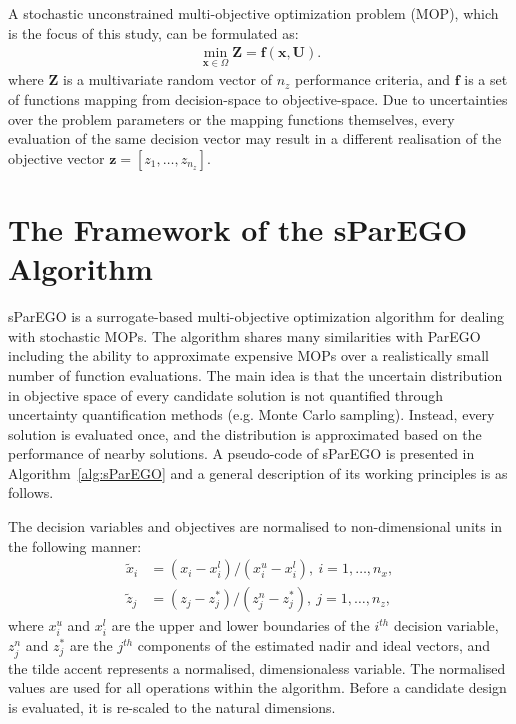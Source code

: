 \documentclass{llncs}
\newcommand{\brr}[1]{{\left({#1}\right)}} %
\newcommand{\vx}{\mathbf{x}} %
\newcommand{\vf}{\mathbf{f}} %
\newcommand{\vz}{\mathbf{z}} %
\newcommand{\vZ}{\mathbf{Z}} %
\newcommand{\vU}{\mathbf{U}} %
\begin{document}
A stochastic unconstrained multi-objective optimization problem (MOP), which is the focus of this study, can be formulated as:
\begin{align}
\label{eq:mop}
        \min_{\vx\in\Omega} \vZ=\vf\brr{\vx, \vU}.
\end{align}
where $\vZ$ is a multivariate random vector of $n_z$ performance criteria, and $\vf$ is a set of functions mapping from decision-space to objective-space. Due to uncertainties over the problem parameters or the mapping functions themselves, every evaluation of the same decision vector may result in a different realisation of the objective vector $\vz=[z_1,\ldots,z_{n_z}]$.

\section{The Framework of the sParEGO Algorithm}\label{sec:framework}


sParEGO is a surrogate-based multi-objective optimization algorithm for dealing with stochastic MOPs. The algorithm shares many similarities with ParEGO including the ability to approximate expensive MOPs over a realistically small number of function evaluations. The main idea is that the uncertain distribution in objective space of every candidate solution is not quantified through uncertainty quantification methods (e.g. Monte Carlo sampling). Instead, every solution is evaluated once, and the distribution is approximated based on the performance of nearby solutions. A pseudo-code of sParEGO is presented in Algorithm~\ref{alg:sParEGO} and a general description of its working principles is as follows.

The decision variables and objectives are normalised to non-dimensional units in the following manner:
\begin{align}
 \tilde{x}_i &= (x_i-x_i^l)/(x_i^u - x_i^l),~i=1,\ldots,n_x,\\
 \tilde{z}_j &= (z_j-z_j^*)/(z_j^n - z_j^*),~j=1,\ldots,n_z,
\end{align}
where $x_i^u$ and $x_i^l$ are the upper and lower boundaries of the $i^{th}$ decision variable, $z_j^n$ and $z_j^*$ are the $j^{th}$ components of the estimated nadir and ideal vectors, and the tilde accent represents a normalised, dimensionaless variable. The normalised values are used for all operations within the algorithm. Before a candidate design is evaluated, it is re-scaled to the natural dimensions.
\end{document}
